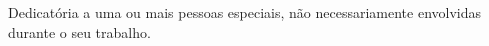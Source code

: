 %
%

\thispagestyle{empty}
\begin{dedicatoria}

Dedicatória a uma ou mais pessoas especiais, não necessariamente envolvidas durante o seu trabalho. 
\end{dedicatoria}